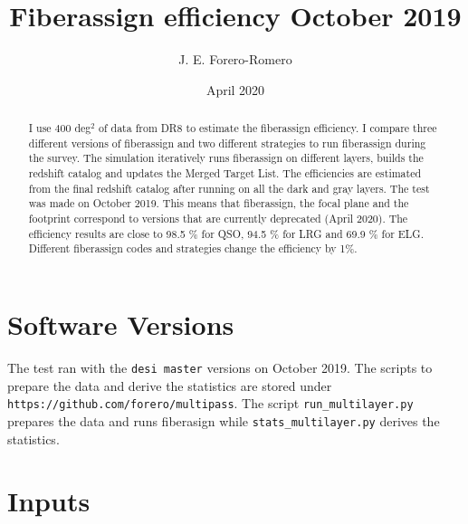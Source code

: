 \documentclass{article}
\title{Fiberassign efficiency October 2019}
\author{J. E. Forero-Romero}
\date{April 2020}
\begin{document}
\maketitle

\begin{abstract}
I use $400$ deg$^2$ of data from DR8 to estimate the fiberassign efficiency.
I compare three different versions of fiberassign and two different
strategies to run fiberassign during the survey. 
The simulation iteratively runs fiberassign on different layers,
builds the redshift catalog and updates the Merged Target List.
The efficiencies are estimated from the final redshift catalog after running 
on all the dark and gray layers.
The test was made on October 2019. This means that fiberassign, the focal
plane and the footprint correspond to versions that are currently deprecated 
(April 2020). 
The efficiency results are close to 98.5 \% for QSO, 94.5 \% for LRG and 69.9 \% for ELG. Different fiberassign codes and strategies change the efficiency by 1\%.
\end{abstract}
\section{Software Versions}

The test ran with the \verb'desi master' versions on October 2019. 
The scripts to prepare the data and derive the statistics are stored
under \verb"https://github.com/forero/multipass". 
The script \verb'run_multilayer.py' prepares the data and runs fiberasign while
\verb'stats_multilayer.py' derives the statistics. 

\section{Inputs}
\end{document}
